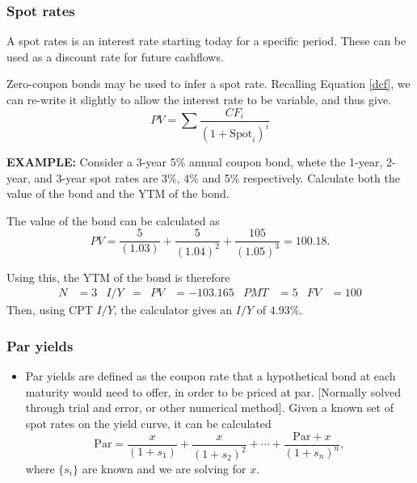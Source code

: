 \documentclass[../notes_compiled.tex]{subfiles}
\begin{document}
\subsubsection{Spot rates}
\begin{itemize}
\item A spot rates is an interest rate starting today for a specific period. These can be used as a discount rate for future cashflows.
\item Zero-coupon bonds may be used to infer a spot rate. Recalling Equation \ref{dcf}, we can re-write it slightly to allow the interest rate to be variable, and thus give.
\begin{equation}
PV = \sum\frac{CF_{i}}{(1+\text{Spot}_{i})^{i}}
\end{equation}

{\color{RedViolet}
\item[] \textbf{EXAMPLE:} Consider a 3-year 5\% annual coupon bond, whete the 1-year, 2-year, and 3-year spot rates are 3\%, 4\% and 5\% respectively. Calculate both the value of the bond and the YTM of the bond.
}
{\color{RoyalBlue}
\item[] The value of the bond can be calculated as
\begin{equation*}
PV = \frac{5}{(1.03)} + \frac{5}{(1.04)^{2}} + \frac{105}{(1.05)^{3}} = 100.18.
\end{equation*}


\item[] Using this, the YTM of the bond is therefore
\begin{align*}
N&=3  & I / Y &=  & PV &=-103.165 & PMT &=5 & FV &= 100
\end{align*}
Then, using CPT $I / Y$, the calculator gives an $I / Y$ of $4.93\%$.

}
\end{itemize}

\subsubsection{Par yields}
\begin{itemize}
\item Par yields are defined as the coupon rate that a hypothetical bond at each maturity would need to offer, in order to be priced at par. [Normally solved through trial and error, or other numerical method]. Given a known set of spot rates on the yield curve, it can be calculated
\begin{equation}
\text{Par} = \frac{x}{(1+s_{1})} + \frac{x}{(1+s_{2})^{2}} + \cdots + \frac{\text{Par} + x}{(1+s_{n})^{n}},
\end{equation}
where $\{s_{i}\}$ are known and we are solving for $x$.
\end{itemize}
\end{document}
